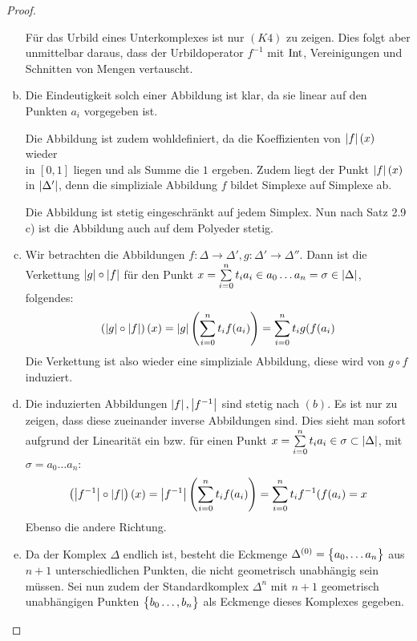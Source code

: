 \begin{Satz}
\begin{proof}
\begin{enumerate}[(a)]
            Für das Urbild eines Unterkomplexes ist nur $(K4)$ zu
            zeigen.  Dies folgt aber unmittelbar daraus, dass der
            Urbildoperator $f^{-1}$ mit $\operatorname{Int}$, Vereinigungen und
            Schnitten von Mengen vertauscht.
          \item Die Eindeutigkeit solch einer Abbildung ist klar, da
            sie linear auf den Punkten $a_i$ vorgegeben ist.

            Die Abbildung ist zudem wohldefiniert, da die
            Koeffizienten von $\left| f \right|(x)$ wieder \\in $[0,1]$ liegen
            und als Summe die $1$ ergeben. Zudem liegt der Punkt
            $\left| f \right|(x)$ in $\left| \Delta' \right|$, denn die simpliziale
            Abbildung $f$ bildet Simplexe auf Simplexe ab. 

            Die Abbildung ist stetig eingeschränkt auf jedem
            Simplex. Nun nach Satz 2.9 c) ist die Abbildung auch auf
            dem Polyeder stetig.

          \item Wir betrachten die Abbildungen
            $f : \Delta \rightarrow \Delta' , g : \Delta' \rightarrow
            \Delta''$.
            Dann ist die Verkettung $\left| g \right| \circ \left| f \right|$ für den
            Punkt
            $x = \sum\limits_{i=0}^{n} t_i a_i \in a_0\ldots a_n = \sigma \in
            \left| \Delta \right|$,
            folgendes:
            \begin{gather*}
              \left( \left| g \right| \circ \left| f \right| \right) (x) = \left| g \right| \left(
                \sum\limits_{i=0}^{n} t_i f(a_i) \right) = \sum\limits_{i=0}^{n} t_i g(f(a_i)
            \end{gather*}
            Die Verkettung ist also wieder eine simpliziale Abbildung,
            diese wird von $g \circ f$ induziert.
          \item Die induzierten Abbildungen $\left| f \right|,\left| f^{-1} \right|$ sind
            stetig nach $(b)$. Es ist nur zu zeigen, dass diese
            zueinander inverse Abbildungen sind. Dies sieht man sofort
            aufgrund der Linearität ein bzw. für einen Punkt
            $x = \sum\limits_{i=0}^{n} t_i a_i \in \sigma \subset \left| \Delta \right|$, mit 
             $\sigma = a_0 \ldots a_n$:
            \begin{gather*}
              \left( \left| f^{-1} \right| \circ \left| f \right| \right) (x) =
              \left| f^{-1} \right| \left( \sum\limits_{i=0}^{n} t_i f(a_i) \right) =
              \sum\limits_{i=0}^{n} t_i f^{-1}(f(a_i) = x
            \end{gather*}
            Ebenso die andere Richtung.
          \item Da der Komplex $\Delta$ endlich ist, besteht die
            Eckmenge $\Delta^{(0)} = \bigl\{  a_0 , \ldots a_n \bigr\}$ aus
            $n+1$ unterschiedlichen Punkten, die nicht geometrisch
            unabhängig sein müssen. Sei nun zudem der Standardkomplex
            $\Delta^n$ mit $n+1$ geometrisch unabhängigen Punkten
            $\bigl\{ b_0 \ldots , b_n \bigr\}$ als Eckmenge dieses Komplexes
            gegeben.


\end{enumerate}
\end{proof}
\end{Satz}
